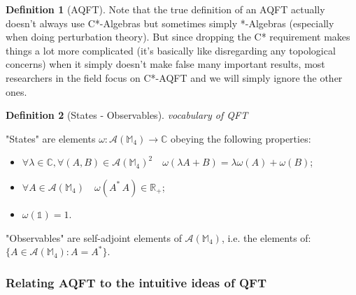 \documentclass[a4paper,11pt]{article}
\numberwithin{equation}{section}
\theoremstyle{definition}
\newtheorem{definition}{Definition}
\newtheorem{comment}{Comment}
\begin{document}
\begin{definition}[AQFT]
Note that the true definition of an AQFT actually doesn't always use C*-Algebras but sometimes simply *-Algebras (especially when doing perturbation theory). But since dropping the C* requirement makes things a lot more complicated (it's basically like disregarding any topological concerns) when it simply doesn't make false many important results, most researchers in the field focus on C*-AQFT and we will simply ignore the other ones.
\end{definition}

\begin{definition}[States - Observables] \emph{vocabulary of QFT}

"States" are elements $\omega: \mathcal{A}(\mathbb{M}_4)\to\mathbb{C}$ obeying the following properties:
\begin{itemize}
    \item $\forall \lambda\in\mathbb{C}, \forall(A,B)\in\mathcal{A}(\mathbb{M}_4)^2\quad \omega(\lambda A+B)=\lambda \omega(A)+\omega(B)$;
    \item $\forall A \in \mathcal{A}(\mathbb{M}_4)\quad \omega(A^*\, A)\in \mathbb{R}_+$;
    \item $\omega(\mathds{1})=1$.
\end{itemize}
"Observables" are self-adjoint elements of $\mathcal{A}(\mathbb{M}_4)$, i.e. the elements of: $\{A \in\mathcal{A}(\mathbb{M}_4):A=A^*\}$.
\end{definition}

\subsubsection{Relating AQFT to the intuitive ideas of QFT}

\end{document}
